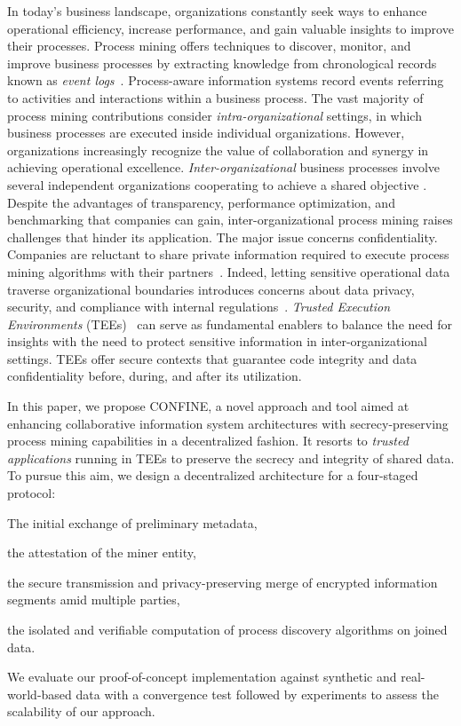 In today's business landscape, organizations constantly seek ways to enhance operational efficiency, increase performance, and gain valuable insights to improve their processes. Process mining offers techniques to discover, monitor, and improve business processes by extracting knowledge from chronological records known as \textit{event logs}~\citep{van2012process}. Process-aware information systems record events referring to activities and interactions within a business process. The vast majority of process mining contributions consider \textit{intra-organizational} settings, in which business processes are executed inside individual organizations. However, organizations increasingly recognize the value of collaboration and synergy in achieving operational excellence. \textit{Inter-organizational} business processes involve several independent organizations cooperating to achieve a shared objective \citep{van2011intra}. Despite the advantages of transparency, performance optimization, and benchmarking that companies can gain, inter-organizational process mining raises challenges that hinder its application. The major issue concerns confidentiality. Companies are reluctant to share private information required to execute process mining algorithms with their partners~\citep{liu2009challenges}. Indeed, letting sensitive operational data traverse organizational boundaries introduces concerns about data privacy, security, and compliance with internal regulations~\citep{muller2021trust}. \emph{Trusted Execution Environments} (TEEs)~\citep{DBLP:conf/trustcom/SabtAB15} can serve as fundamental enablers to balance the need for insights with the need to protect sensitive information in inter-organizational settings. TEEs offer secure contexts that guarantee code integrity and data confidentiality before, during, and after its utilization. %

In this paper, we propose CONFINE, a novel approach and tool aimed at enhancing collaborative information system architectures with secrecy-preserving process mining capabilities in a decentralized fashion. It resorts to \textit{trusted applications} running in TEEs to preserve the secrecy and integrity of shared data. To pursue this aim, we design a decentralized architecture for a four-staged protocol:
\begin{inparaenum}
	\item The initial exchange of preliminary metadata,
	\item the attestation of the miner entity,
	\item the secure transmission and privacy-preserving merge of encrypted information segments amid multiple parties,
	\item the isolated and verifiable computation of process discovery algorithms on joined data.
\end{inparaenum}
%
We evaluate our proof-of-concept implementation against synthetic and real-world-based data with a convergence test followed by experiments to assess the scalability of our approach.

